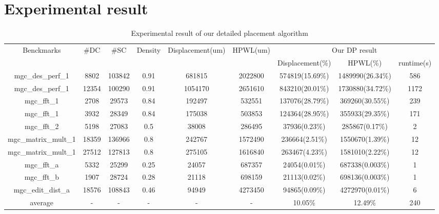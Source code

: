 \documentclass[sigconf,authordraft]{acmart}
\begin{document}
\section{Experimental result}

\begin{table*}
\caption{Experimental result of our detailed placement algorithm}
\centering
\begin{tabular}{|c|c|c|c|c|c|ccc|}
\hline
\multirow{2}{*}{Benckmarks} & \multirow{2}{*}{\#DC} & \multirow{2}{*}{\#SC} & 
\multirow{2}{*}{Density} & \multirow{2}{*}{Displacement(um)} & \multirow{2}{*}{HPWL(um)} & \multicolumn{3}{c|}{Our DP result}  \\
             &&&     &    &              & Displacement(\%)   & HPWL(\%) & runtime(s)    \\ 
\hline
mgc\_des\_perf\_1    & 8802   & 103842 & 0.91 & 681815 & 2022800 & 574819(15.69\%) & 1489990(26.34\%) & 586  \\
\hline
mgc\_des\_perf\_1    & 12354  & 100290 & 0.91 & 1054170 & 2651610 & 843210(20.01\%) & 1730880(34.72\%) & 1172  \\
\hline
mgc\_fft\_1          & 2708   & 29573 & 0.84  & 192497 & 532551 & 137076(28.79\%) & 369260(30.55\%) & 239  \\
\hline
mgc\_fft\_1          & 3932   & 28349 & 0.84  & 175038 & 503853 & 124364(28.95\%) & 355933(29.35\%) & 171  \\
\hline
mgc\_fft\_2          & 5198   & 27083 & 0.5   & 38008  & 286495 & 37936(0.23\%)  & 285867(0.17\%) & 2  \\
\hline
mgc\_matrix\_mult\_1 & 18359  & 136966 & 0.8  & 242767 & 1572490  & 236664(2.51\%)  & 1550670(1.39\%) & 12  \\
\hline
mgc\_matrix\_mult\_1 & 27512  & 127813 & 0.8  & 275105 & 1616840 & 263467(4.23\%)  & 1581010(2.22\%) & 12 \\
\hline
mgc\_fft\_a          & 5332   & 25299 & 0.25  & 24057  & 687357 & 24054(0.01\%)  & 687338(0.003\%) & 1  \\
\hline
mgc\_fft\_b          & 1907   & 28724 & 0.28  & 21118  & 698159 & 21113(0.02\%)  & 698136(0.003\%) & 1  \\
\hline
mgc\_edit\_dist\_a   & 18576  & 108843 & 0.46 & 94949  & 4273450 & 94865(0.09\%)  & 4272970(0.01\%)  & 6  \\
\hline
average   & -  & - & - & - & - & 10.05\%  & 12.49\%  & 240  \\
\hline
\end{tabular}
\end{table*}
\end{document}
